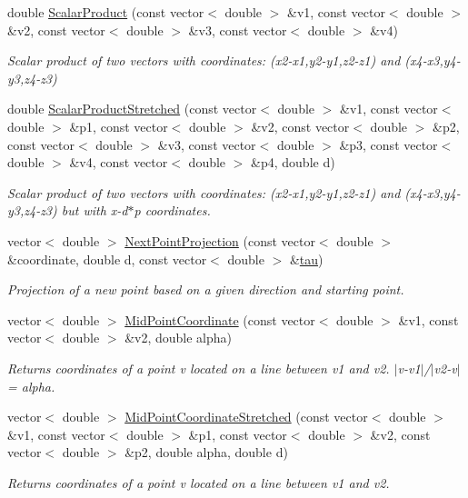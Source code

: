\begin{DoxyCompactItemize}
double \hyperlink{namespacemathfunc_a003be58c2f6df9098c88b2ae33d5b5d4}{Scalar\+Product} (const vector$<$ double $>$ \&v1, const vector$<$ double $>$ \&v2, const vector$<$ double $>$ \&v3, const vector$<$ double $>$ \&v4)
\begin{DoxyCompactList}\small\item\em Scalar product of two vectors with coordinates\+: (x2-\/x1,y2-\/y1,z2-\/z1) and (x4-\/x3,y4-\/y3,z4-\/z3) \end{DoxyCompactList}\item 
double \hyperlink{namespacemathfunc_a3dffb1288c676c7809d4a6caae9601bb}{Scalar\+Product\+Stretched} (const vector$<$ double $>$ \&v1, const vector$<$ double $>$ \&p1, const vector$<$ double $>$ \&v2, const vector$<$ double $>$ \&p2, const vector$<$ double $>$ \&v3, const vector$<$ double $>$ \&p3, const vector$<$ double $>$ \&v4, const vector$<$ double $>$ \&p4, double d)
\begin{DoxyCompactList}\small\item\em Scalar product of two vectors with coordinates\+: (x2-\/x1,y2-\/y1,z2-\/z1) and (x4-\/x3,y4-\/y3,z4-\/z3) but with x-\/d$\ast$p coordinates. \end{DoxyCompactList}\item 
vector$<$ double $>$ \hyperlink{namespacemathfunc_a1781854650a2eb9e2d88ad0ee14a8a69}{Next\+Point\+Projection} (const vector$<$ double $>$ \&coordinate, double d, const vector$<$ double $>$ \&\hyperlink{common_8h_abca55e6a21e0401c42bfb5da79ad3ad5}{tau})
\begin{DoxyCompactList}\small\item\em Projection of a new point based on a given direction and starting point. \end{DoxyCompactList}\item 
vector$<$ double $>$ \hyperlink{namespacemathfunc_a5c9392edbc56add20a4f95d7406a6757}{Mid\+Point\+Coordinate} (const vector$<$ double $>$ \&v1, const vector$<$ double $>$ \&v2, double alpha)
\begin{DoxyCompactList}\small\item\em Returns coordinates of a point v located on a line between v1 and v2. $\vert$v-\/v1$\vert$/$\vert$v2-\/v$\vert$ = alpha. \end{DoxyCompactList}\item 
vector$<$ double $>$ \hyperlink{namespacemathfunc_aaaf523827e15939d17307f0c3724973c}{Mid\+Point\+Coordinate\+Stretched} (const vector$<$ double $>$ \&v1, const vector$<$ double $>$ \&p1, const vector$<$ double $>$ \&v2, const vector$<$ double $>$ \&p2, double alpha, double d)
\begin{DoxyCompactList}\small\item\em Returns coordinates of a point v located on a line between v1 and v2. \end{DoxyCompactList}\end{DoxyCompactItemize}


